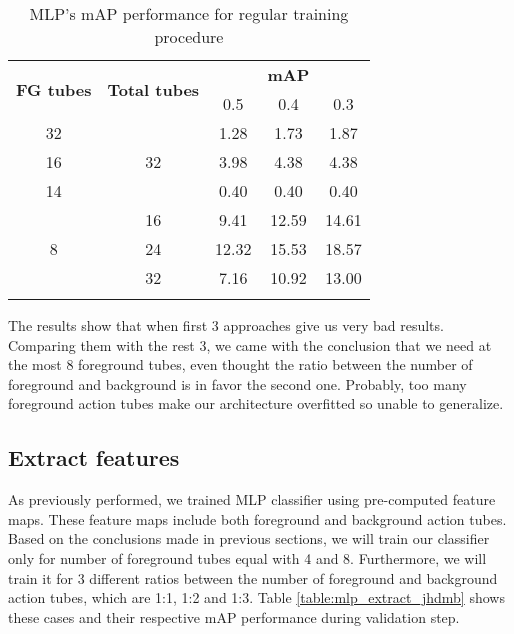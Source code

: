 \begin{center}
  \begin{longtable}{|| c | c || c c c ||}
    \hline
    \multirow{2}{*}{\textbf{FG tubes}} & \multirow{2}{*}{\textbf{Total tubes}} & {} &  \textbf{mAP} & {} \\
    {} & {} & 0.5 & 0.4 & 0.3 \\
    \hline
    32 & \multirow{3}{*}{32} &1.28 & 1.73 & 1.87  \\
    \cline{1-1} \cline{3-5}
    16 & {} & 3.98 & 4.38 & 4.38  \\
    \cline{1-1} \cline{3-5}
    14 & {} & 0.40 & 0.40 & 0.40 \\
    \hline
    \multirow{3}{*}{8} & 16 & 9.41 & 12.59 & 14.61 \\
    \cline{2-5}
    {} & 24 & 12.32 & 15.53 & 18.57 \\
    \cline{2-5}
    {} & 32 & 7.16 & 10.92 & 13.00 \\
    \hline
    \caption{MLP's mAP performance for regular training procedure}
    \label{table:mlp_reg}
  \end{longtable}
\end{center}

The results show that when first 3 approaches give us very bad results. Comparing them with the rest 3, we came with the conclusion that we
need at the most 8 foreground tubes, even thought the ratio between the number of foreground and background is in favor the second one.
Probably, too many foreground action tubes make our architecture overfitted so unable to generalize.

\subsection{Extract features}

As previously performed, we trained MLP classifier using pre-computed feature maps. These feature maps include both foreground and background
action tubes. Based on the conclusions made in previous sections, we will train our classifier only for number of foreground tubes equal with 4
and 8. Furthermore, we will train it for 3 different ratios between the number of foreground and background action tubes, which are 1:1, 1:2
and 1:3. Table \ref{table:mlp_extract_jhdmb} shows these cases and their respective mAP performance during validation step.

